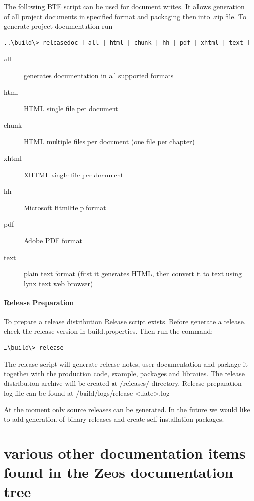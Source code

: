 \documentclass[a4paper,12pt,oneside]{book}
\begin{document}
The following BTE script can be used for document writes.
It allows generation of all project documents in specified format and packaging then into .zip file.
To generate project documentation run:

\begin{verbatim}
..\build\> releasedoc [ all | html | chunk | hh | pdf | xhtml | text ]
\end{verbatim}

\begin{description}
\item [all] generates documentation in all supported formats
\item [html] HTML single file per document
\item [chunk] HTML multiple files per document (one file per chapter)
\item [xhtml] XHTML single file per document
\item [hh] Microsoft HtmlHelp format
\item [pdf] Adobe PDF format
\item [text] plain text format (first it generates HTML, then convert it to text using lynx text web browser)
\end{description}

\subsection{Release Preparation}
To prepare a release distribution Release script exists.
Before generate a release, check the release version in build.properties.
Then run the command:

\begin{verbatim}
…\build\> release
\end{verbatim}

The release script will generate release notes, user documentation and package it together with the production code, example, packages and libraries.
The release distribution archive will be created at /releases/ directory.
Release preparation log file can be found at /build/logs/release-\textless date\textgreater.log

At the moment only source releases can be generated.
In the future we would like to add generation of binary releases and create self-installation packages.

\part{various other documentation items found in the Zeos documentation tree}
\end{document}
